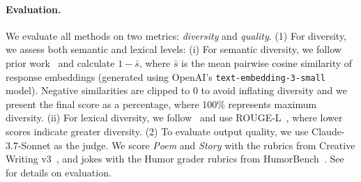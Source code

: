 \paragraph{Evaluation.}
We evaluate all methods on two metrics: \textit{diversity} and \textit{quality}. (1) For diversity, we assess both semantic and lexical levels: (i) For semantic diversity, we follow prior work~\citep{cox2021directed,cann2023usingsemanticsimilaritytext,lu2025aihumanityssalieriquantifying,zhu2025bareleveragingbaselanguage} and calculate $1 - \bar{s}$, where $\bar{s}$ is the mean pairwise cosine similarity of response embeddings (generated using OpenAI's \texttt{text-embedding-3-small} model). Negative similarities are clipped to 0 to avoid inflating diversity and we present the final score as a percentage, where 100\% represents maximum diversity. 
(ii) For lexical diversity, we follow~\cite{shaib2025standardizingmeasurementtextdiversity} and use ROUGE-L~\citep{lin-2004-rouge}, where lower scores indicate greater diversity. 
(2) To evaluate output quality, we use Claude-3.7-Sonnet as the judge. We score \textit{Poem} and \textit{Story} with the rubrics from Creative Writing v3~\citep{paech2023eqbench}, and jokes with the Humor grader rubrics from HumorBench~\citep{narad2025llmsjokeprobingnonstem}. See  for details on evaluation.




